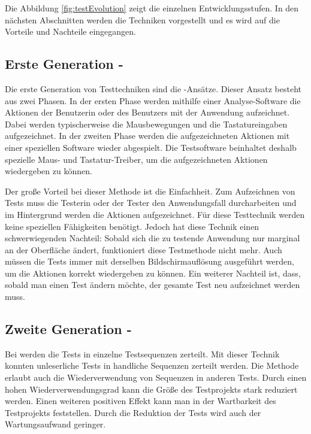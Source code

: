 \SuperPar
Die Abbildung \ref{fig:testEvolution} zeigt die einzelnen Entwicklungsstufen. In den nächsten Abschnitten werden die Techniken vorgestellt und es wird auf die Vorteile und Nachteile eingegangen.

\subsection{Erste Generation - }

Die erste Generation von Testtechniken sind die -Ansätze. Dieser Ansatz besteht aus zwei Phasen. In der ersten Phase werden mithilfe einer Analyse-Software die Aktionen der Benutzerin oder des Benutzers mit der Anwendung aufzeichnet. Dabei werden typischerweise die Mausbewegungen und die Tastatureingaben aufgezeichnet. In der zweiten Phase werden die aufgezeichneten Aktionen mit einer speziellen Software wieder abgespielt. Die Testsoftware beinhaltet deshalb spezielle Maus- und Tastatur-Treiber, um die aufgezeichneten Aktionen wiedergeben zu können.

\SuperPar
Der große Vorteil bei dieser Methode ist die Einfachheit. Zum Aufzeichnen von Tests muss die Testerin oder der Tester den Anwendungsfall durcharbeiten und im Hintergrund werden die Aktionen aufgezeichnet. Für diese Testtechnik werden keine speziellen Fähigkeiten benötigt. Jedoch hat diese Technik einen schwerwiegenden Nachteil: Sobald sich die zu testende Anwendung nur marginal an der Oberfläche ändert, funktioniert diese Testmethode nicht mehr. Auch müssen die Tests immer mit derselben Bildschirmauflösung ausgeführt werden, um die Aktionen korrekt wiedergeben zu können. Ein weiterer Nachteil ist, dass, sobald man einen Test ändern möchte, der gesamte Test neu aufzeichnet werden muss.

\subsection{Zweite Generation - }

Bei  werden die Tests in einzelne Testsequenzen zerteilt. Mit dieser Technik konnten unleserliche Tests in handliche Sequenzen zerteilt werden. Die Methode erlaubt auch die Wiederverwendung von Sequenzen in anderen Tests. Durch einen hohen Wiederverwendungsgrad kann die Größe des Testprojekts stark reduziert werden. Einen weiteren positiven Effekt kann man in der Wartbarkeit des Testprojekts feststellen. Durch die Reduktion der Tests wird auch der Wartungsaufwand geringer.

